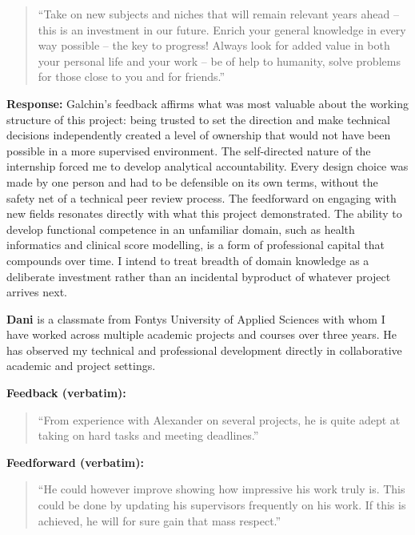 \documentclass[11pt,a4paper]{report}
\begin{document}
\begin{quote}
``Take on new subjects and niches that will remain relevant years ahead -- this is an investment in our future. Enrich your general knowledge in every way possible -- the key to progress! Always look for added value in both your personal life and your work -- be of help to humanity, solve problems for those close to you and for friends.''
\end{quote}

\textbf{Response:} Galchin's feedback affirms what was most valuable about the working structure of
this project: being trusted to set the direction and make technical decisions independently created
a level of ownership that would not have been possible in a more supervised environment. The
self-directed nature of the internship forced me to develop analytical accountability. Every design
choice was made by one person and had to be defensible on its own terms, without the safety net of
a technical peer review process. The feedforward on engaging with new fields resonates directly
with what this project demonstrated. The ability to develop functional competence in an unfamiliar
domain, such as health informatics and clinical score modelling, is a form of professional
capital that compounds over time. I intend to treat breadth of domain knowledge as a deliberate
investment rather than an incidental byproduct of whatever project arrives next.

\bigskip

\textbf{Dani} is a classmate from Fontys University of Applied Sciences with whom I have worked
across multiple academic projects and courses over three years. He has observed my technical and
professional development directly in collaborative academic and project settings.

\textbf{Feedback (verbatim):}

\begin{quote}
``From experience with Alexander on several projects, he is quite adept at taking on hard tasks and meeting deadlines.''
\end{quote}

\textbf{Feedforward (verbatim):}

\begin{quote}
``He could however improve showing how impressive his work truly is. This could be done by updating his supervisors frequently on his work. If this is achieved, he will for sure gain that mass respect.''
\end{quote}
\end{document}
